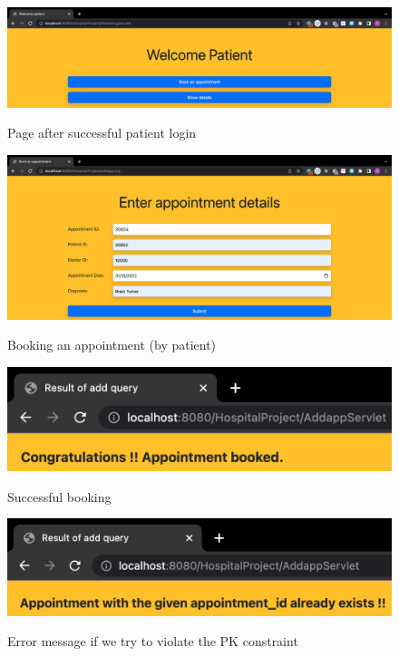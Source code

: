 \documentclass[12pt]{article}
\begin{document}
\vspace{15mm}

\begin{figure}[!hbt]
    \centering
    \includegraphics[scale=0.35]{screenshots/4b.png}
    \label{fig:data}
    \caption{Page after successful patient login}
\end{figure}

\newpage

\begin{figure}[!hbt]
    \centering
    \includegraphics[scale=0.35]{screenshots/4c.png}
    \label{fig:my_label1}
    \caption{Booking an appointment (by patient) }
\end{figure}

\begin{figure}[!hbt]
    \centering
    \includegraphics[scale=0.9]{screenshots/4d.png}
    \label{fig:data}
    \caption{Successful booking}
\end{figure}

\begin{figure}[!hbt]
    \centering
    \includegraphics[scale=0.9]{screenshots/4e.png}
    \label{fig:my_label1}
    \caption{Error message if we try to violate the PK constraint}
\end{figure}
\end{document}
